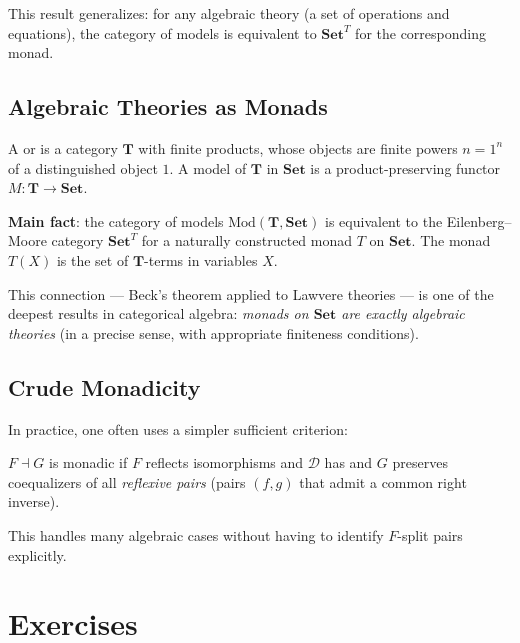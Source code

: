 This result generalizes: for any algebraic theory (a set of operations and
equations), the category of models is equivalent to $\mathbf{Set}^T$ for
the corresponding monad.

\subsection{Algebraic Theories as Monads}

A  or  is a category $\mathbf{T}$
with finite products, whose objects are finite powers $n = 1^n$ of a
distinguished object $1$. A model of $\mathbf{T}$ in $\mathbf{Set}$ is a
product-preserving functor $M : \mathbf{T} \to \mathbf{Set}$.

\textbf{Main fact}: the category of models $\mathrm{Mod}(\mathbf{T},
\mathbf{Set})$ is equivalent to the Eilenberg--Moore category $\mathbf{Set}^T$
for a naturally constructed monad $T$ on $\mathbf{Set}$. The monad $T(X)$
is the set of $\mathbf{T}$-terms in variables $X$.

This connection --- Beck's theorem applied to Lawvere theories --- is one
of the deepest results in categorical algebra: \emph{monads on $\mathbf{Set}$
are exactly algebraic theories} (in a precise sense, with appropriate
finiteness conditions).

\subsection{Crude Monadicity}

In practice, one often uses a simpler sufficient criterion:

\begin{theorem}
$F \dashv G$ is monadic if $F$ reflects isomorphisms and $\mathcal{D}$ has
and $G$ preserves coequalizers of all \emph{reflexive pairs} (pairs $(f,g)$
that admit a common right inverse).
\end{theorem}

This handles many algebraic cases without having to identify $F$-split pairs
explicitly.


\section{Exercises}
\label{sec:monads-beck-exercises}

